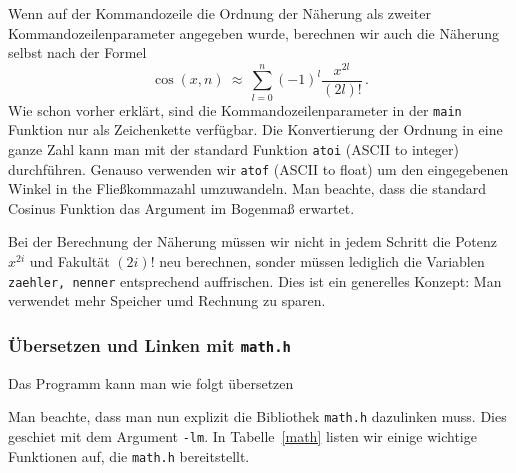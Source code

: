 Wenn auf der Kommandozeile die Ordnung der Näherung als zweiter Kommandozeilenparameter angegeben wurde, berechnen wir auch die Näherung selbst nach der Formel
\begin{equation}
  \cos\left(x,n\right)\ \approx\ \sum_{l=0}^{n} \left(-1\right)^{l} \dfrac{x^{2l}}{\left(2l\right)!}\,.
\end{equation}
Wie schon vorher erklärt, sind die Kommandozeilenparameter in der \texttt{main} Funktion nur als Zeichenkette verfügbar.
Die Konvertierung der Ordnung in eine ganze Zahl kann man mit der standard Funktion \texttt{atoi} (ASCII to integer) durchführen.
Genauso verwenden wir \texttt{atof} (ASCII to float) um den eingegebenen Winkel in the Fließkommazahl umzuwandeln.
Man beachte, dass die standard Cosinus Funktion das Argument im Bogenmaß erwartet.

Bei der Berechnung der Näherung müssen wir nicht in jedem Schritt die Potenz $x^{2i}$ und Fakultät $(2i)!$ neu berechnen, sonder müssen lediglich die Variablen \texttt{zaehler, nenner} entsprechend auffrischen.
Dies ist ein generelles Konzept: Man verwendet mehr Speicher umd Rechnung zu sparen.

\subsubsection{Übersetzen und Linken mit \texttt{math.h}}

Das Programm kann man wie folgt übersetzen

\vspace*{0.5cm}
\vspace*{0.5cm}

\noindent Man beachte, dass man nun explizit die Bibliothek \texttt{math.h} dazulinken muss.
Dies geschiet mit dem Argument \texttt{-lm}.
In Tabelle~\ref{math} listen wir einige wichtige Funktionen auf, die \texttt{math.h} bereitstellt.

